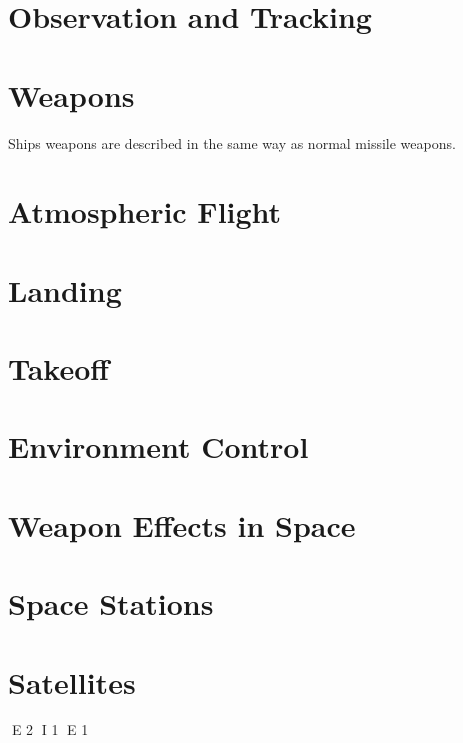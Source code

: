 \section{Observation and Tracking}
\section{Weapons}
Ships weapons are de\-scribed in the same way as nor\-mal mis\-sile weapons.

\section{Atmospheric Flight}
\section{Landing}
\section{Takeoff}
\section{Environment Control}
\section{Weapon Effects in Space}
\section{Space Stations}
\section{Satellites}


E 2
I 1
E 1

